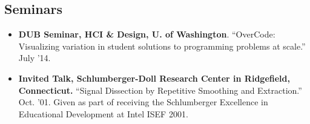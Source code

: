 \documentclass[margin]{res}
\begin{document}
\begin{resume}
\section{Seminars}
\begin{itemize}[leftmargin=*]
\item {\bf DUB Seminar, HCI \& Design, U. of Washington}. ``OverCode: Visualizing variation in student solutions to programming problems at scale.'' \hfill July '14.
\item {\bf Invited Talk, Schlumberger-Doll Research Center in Ridgefield, Connecticut.} ``Signal Dissection by Repetitive Smoothing and Extraction.'' \hfill Oct. '01.
Given as part of receiving the Schlumberger Excellence in Educational Development at Intel ISEF 2001.
\end{itemize}
 

\end{resume}
\end{document}
